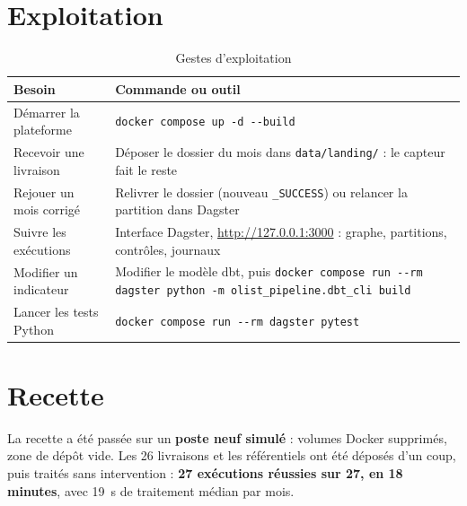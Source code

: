 \documentclass[11pt, a4paper, oneside, headings=normal, numbers=noenddot, DIV=12]{scrartcl}
\begin{document}
\section{Exploitation}
\begin{table}[H]
\centering\small
\begin{tabularx}{\linewidth}{@{}L{4.6cm} Y@{}}
\toprule
\textbf{Besoin} & \textbf{Commande ou outil} \\
\midrule
Démarrer la plateforme & \texttt{docker compose up -d -{}-build} \\
Recevoir une livraison & Déposer le dossier du mois dans \texttt{data/landing/} : le capteur fait le reste \\
Rejouer un mois corrigé & Relivrer le dossier (nouveau \texttt{\_SUCCESS}) ou relancer la partition dans Dagster \\
Suivre les exécutions & Interface Dagster, \url{http://127.0.0.1:3000} : graphe, partitions, contrôles, journaux \\
Modifier un indicateur & Modifier le modèle dbt, puis \texttt{docker compose run -{}-rm dagster python -m olist\_pipeline.dbt\_cli build} \\
Lancer les tests Python & \texttt{docker compose run -{}-rm dagster pytest} \\
\bottomrule
\end{tabularx}
\caption{Gestes d'exploitation}
\end{table}

\section{Recette}
La recette a été passée sur un \textbf{poste neuf simulé} : volumes Docker supprimés, zone de dépôt vide. Les 26 livraisons et les
référentiels ont été déposés d'un coup, puis traités sans intervention : \textbf{27 exécutions réussies sur 27, en 18 minutes},
avec 19~s de traitement médian par mois.
\end{document}

